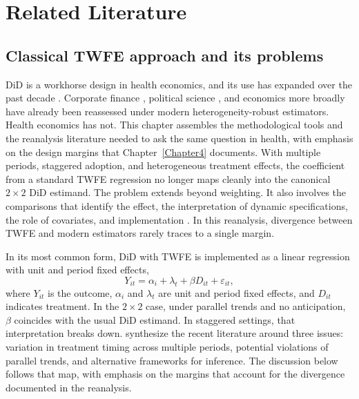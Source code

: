 \chapter{Related Literature}
\label{Chapter2}

\section{Classical TWFE approach and its problems}

DiD is a workhorse design in health economics, and its use has expanded over the past decade \parencite{goldsmith2024tracking}. Corporate finance \parencite{baker2022much}, political science \parencite{chiu2026causal}, and economics more broadly \parencite{brodeur2026reproducibility} have already been reassessed under modern heterogeneity-robust estimators. Health economics has not. This chapter assembles the methodological tools and the reanalysis literature needed to ask the same question in health, with emphasis on the design margins that Chapter~\ref{Chapter4} documents. With multiple periods, staggered adoption, and heterogeneous treatment effects, the coefficient from a standard TWFE regression no longer maps cleanly into the canonical \(2\times 2\) DiD estimand. The problem extends beyond weighting. It also involves the comparisons that identify the effect, the interpretation of dynamic specifications, the role of covariates, and implementation \parencite{dechaisemartin2020twfe, callaway2021difference, sun2021estimating, borusyak2023did_imputation, wooldridge2025two}. In this reanalysis, divergence between TWFE and modern estimators rarely traces to a single margin.

In its most common form, DiD with TWFE is implemented as a linear regression with unit and period fixed effects,
\begin{equation}
Y_{it} = \alpha_i + \lambda_t + \beta D_{it} + \varepsilon_{it},
\label{eq:twfe_static}
\end{equation}
where \(Y_{it}\) is the outcome, \(\alpha_i\) and \(\lambda_t\) are unit and period fixed effects, and \(D_{it}\) indicates treatment. In the \(2\times 2\) case, under parallel trends and no anticipation, \(\beta\) coincides with the usual DiD estimand. In staggered settings, that interpretation breaks down. \textcite{roth2023s} synthesize the recent literature around three issues: variation in treatment timing across multiple periods, potential violations of parallel trends, and alternative frameworks for inference. The discussion below follows that map, with emphasis on the margins that account for the divergence documented in the reanalysis.

